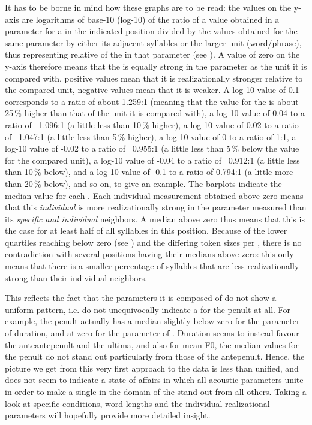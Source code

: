 \documentclass[output=paper]{LSP/langsci}
\begin{document}
{\begin{samepage}
It has to be borne in mind how these graphs are to be read: the values on the y-axis are logarithms of base-10 (log-10) of the ratio of a value obtained in a parameter for a  in the indicated position divided by the values obtained for the same parameter by either its adjacent syllables or the larger unit (word/phrase), thus representing relative  of the  in that parameter (see ). A value of zero on the y-axis therefore means that the  is equally strong in the parameter as the unit it is compared with, positive values mean that it is realizationally stronger relative to the compared unit, negative values mean that it is weaker. A log-10 value of 0.1 corresponds to a ratio of about 1.259:1 (meaning that the value for the  is about 25\,\% higher than that of the unit it is compared with), a log-10 value of 0.04 to a ratio of ~1.096:1 (a little less than 10\,\% higher), a log-10 value of 0.02 to a ratio of ~1.047:1 (a little less than 5\,\% higher), a log-10 value of 0 to a ratio of 1:1, a log-10 value of -0.02 to a ratio of ~0.955:1 (a little less than 5\,\% below the value for the compared unit), a log-10 value of -0.04 to a ratio of ~0.912:1 (a little less than 10\,\% below), and a log-10 value of -0.1 to a ratio of 0.794:1 (a little more than 20\,\% below), and so on, to give an example. The barplots indicate the median value for each . Each individual measurement obtained above zero means that this \textit{individual}  is more realizationally strong in the parameter measured than its \textit{specific} \textit{and individual} neighbors. A median above zero thus means that this is the case for at least half of all syllables in this position. Because of the lower quartiles reaching below zero (see ) and the differing token sizes per , there is no contradiction with several positions having their medians above zero: this only means that there is a smaller percentage of syllables that are less realizationally strong than their individual neighbors.
\end{samepage}
}
This reflects the fact that the parameters it is composed of do not show a uniform pattern, i.e. do not unequivocally indicate a  for the penult at all. For example, the penult actually has a median slightly below zero for the parameter of duration, and at zero for the parameter of . Duration seems to instead favour the anteantepenult and  the ultima, and also for mean F0, the median values for the penult do not stand out particularly from those of the antepenult. Hence, the picture we get from this very first approach to the data is less than unified, and does not seem to indicate a state of affairs in which all acoustic parameters unite in order to make a single  in the domain of the  stand out from all others. Taking a look at specific conditions, word lengths and the individual realizational parameters will hopefully provide more detailed insight.
\end{document}

